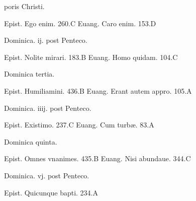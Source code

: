 \documentclass[a5paper,10pt]{book}
\def\ae{æ}
\begin{document}
\begin{multicols}{2}
\begin{center}
\normalsize poris Christi.
\end{center}
\vspace{-.5em}
\par \noindent Epist. Ego enim. \hfill 260.C
\newline Euang. Caro enim. \hfill 153.D%
\newline \vspace{-1.75em}
\begin{center}
\color{red} Dominica. ij. post Penteco.
\end{center}
\vspace{-.75em}
\par \noindent Epist. Nolite mirari. \hfill 183.B
\newline Euang. Homo quidam. \hfill 104.C
\newline \vspace{-1.75em}
\begin{center}
\color{red} Dominica tertia.
\end{center}
\vspace{-.75em}
\par \noindent Epist. Humiliamini. \hfill 436.B
\newline Euang. Erant autem appro. \hfill 105.A
\newline \vspace{-1.75em}
\begin{center}
\color{red} Dominica. iiij. post Penteco.
\end{center}
\vspace{-.75em}
\par \noindent Epist. Existimo. \hfill 237.C
\newline Euang. Cum turb\ae . \hfill 83.A%
\newline \vspace{-1.75em}
\begin{center}
\color{red} Dominica quinta.
\end{center}
\vspace{-.75em}
\par \noindent Epist. Omnes vnanimes. \hfill 435.B
\newline Euang. Nisi abundaue. \hfill 344.C
\newline \vspace{-1.75em}
\begin{center}
\color{red} Dominica. vj. post Penteco.
\end{center}
\vspace{-.75em}
\par \noindent Epist. Quicunque bapti. \hfill 234.A

\end{multicols}
\end{document}
